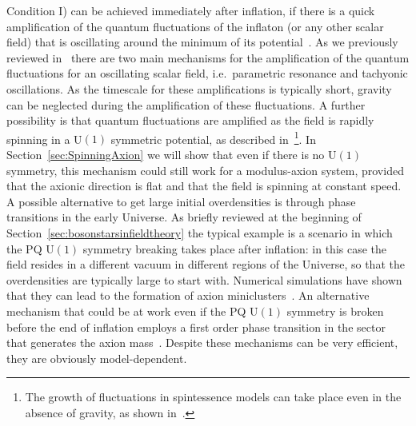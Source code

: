 \documentclass[11pt,a4paper]{article}
\begin{document}
Condition I) can be achieved immediately after inflation, if there is a quick amplification of the quantum fluctuations of the inflaton (or any other scalar field) that is oscillating around the minimum of its potential~\cite{Amin:2014eta}. As we previously reviewed in~\cite{Antusch:2017flz} there are two main mechanisms for the amplification of the quantum fluctuations for an oscillating scalar field, i.e.~parametric resonance and tachyonic oscillations. As the timescale for these amplifications is typically short, gravity can be neglected during the amplification of these fluctuations. A further possibility is that quantum fluctuations are amplified as the field is rapidly spinning in a U$(1)$ symmetric potential, as described in~\cite{Boyle:2001du}\footnote{The growth of fluctuations in spintessence models can take place even in the absence of gravity, as shown in~\cite{Kasuya:2001pr}.}. In Section~\ref{sec:SpinningAxion} we will show that even if there is no U$(1)$ symmetry, this mechanism could still work for a modulus-axion system, provided that the axionic direction is flat and that the field is spinning at constant speed. \\

A possible alternative to get large initial overdensities is through phase transitions in the early Universe. As briefly reviewed at the beginning of Section~\ref{sec:bosonstarsinfieldtheory} the typical example is a scenario in which the PQ U$(1)$ symmetry breaking takes place after inflation: in this case the field resides in a different vacuum in different regions of the Universe, so that the overdensities are typically large to start with. Numerical simulations have shown that they can lead to the formation of axion miniclusters~\cite{Hogan:1988mp, Kolb:1993zz, Kolb:1993hw, Enander:2017ogx}. An alternative mechanism that could be at work even if the PQ U$(1)$ symmetry is broken before the end of inflation employs a first order phase transition in the sector that generates the axion mass~\cite{Hardy:2016mns}. Despite these mechanisms can be very efficient, they are obviously model-dependent.\\
\end{document}
